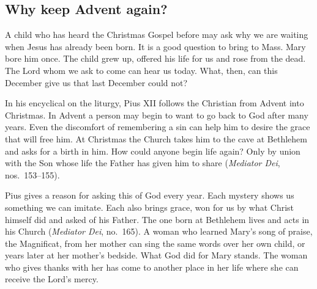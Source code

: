 \subsection{Why keep Advent again?}

A child who has heard the Christmas Gospel before may ask why we are
waiting when Jesus has already been born. It is a good question to
bring to Mass. Mary bore him once. The child grew up, offered his life
for us and rose from the dead. The Lord whom we ask to come can hear
us today. What, then, can this December give us that last December
could not?

In his encyclical on the liturgy, Pius XII follows the Christian from
Advent into Christmas. In Advent a person may begin to want to go back
to God after many years. Even the discomfort of remembering a sin can
help him to desire the grace that will free him. At Christmas the
Church takes him to the cave at Bethlehem and asks for a birth in him.
How could anyone begin life again? Only by union with the Son whose
life the Father has given him to share (\emph{Mediator Dei},
nos.~153--155).

Pius gives a reason for asking this of God every year. Each mystery
shows us something we can imitate. Each also brings grace, won for us
by what Christ himself did and asked of his Father. The one born at
Bethlehem lives and acts in his Church (\emph{Mediator Dei}, no.~165).
A woman who learned Mary's song of praise, the Magnificat,
from her mother can sing the same words over her own
child, or years later at her mother's bedside. What God did for Mary
stands. The woman who gives thanks with her has come to another
place in her life where she can receive the Lord's mercy.
